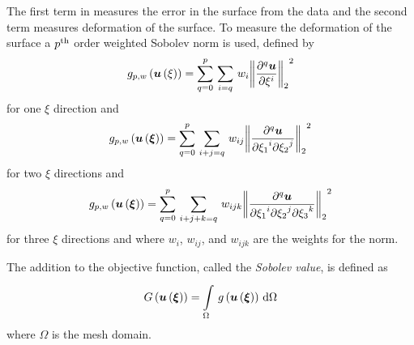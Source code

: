 The first term in  measures the error in the
surface from the data and the second term measures deformation of the surface.
To measure the deformation of the surface a ${p}^{\text{th}}$ order weighted
Sobolev norm \cite{terzopoulos:1986,zzz-tikhonov:1977} is used, defined by
\begin{equation}
  \fnof{g_{p,w}}{\fnof{\vectr{u}}{\xi}}=\gsum{q=0}{p}{\gsum{i=q}{}
  {w_{i}\norm{\delnby{q}{\vectr{u}}{\xi}{i}}^{2}}}
  \label{eqn:1DSobolevnorm}
\end{equation}
for one $\xi$ direction and
\begin{equation}
  \fnof{g_{p,w}}{\fnof{\vectr{u}}{\vectr{\xi}}}=\gsum{q=0}{p}{\gsum{i+j=q}{}
  {w_{ij}\norm{\delntwoby{q}{\vectr{u}}{\xione}{i}{\xitwo}{j}}^{2}}}
  \label{eqn:2DSobolevnorm}
\end{equation}
for two $\xi$ directions and
\begin{equation}
  \fnof{g_{p,w}}{\fnof{\vectr{u}}{\vectr{\xi}}}=\gsum{q=0}{p}{\gsum{i+j+k=q}{}
  {w_{ijk}\norm{\delnthreeby{q}{\vectr{u}}{\xione}{i}{\xitwo}{j}{\xithree}{k}}^{2}}}
  \label{eqn:3DSobolevnorm}
\end{equation}
for three $\xi$ directions and where $w_{i}$, $w_{ij}$, and $w_{ijk}$ are the weights for the norm.

The addition to the objective function, called the \emph{Sobolev value}, is
defined as
\begin{equation}
  \fnof{G}{\fnof{\vectr{u}}{\vectr{\xi}}}=\gint{\Omega}{}{\fnof{g}{
      \fnof{\vectr{u}}{\vectr{\xi}}}}{\Omega}
  \label{eqn:Sobolevvalue}
\end{equation}
where $\Omega$ is the mesh domain.

